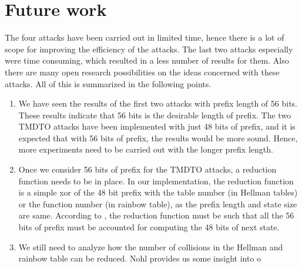 



\section{Future work}

The four attacks have been carried out in limited time, hence there is a lot of scope for improving the efficiency of the attacks. The last two attacks especially were time consuming, which resulted in a less number of results for them. Also there are many open research possibilities on the ideas concerned with these attacks. All of this is summarized in the following points. 

\begin{enumerate}
\item We have seen the results of the first two attacks with prefix length of 56 bits. These results indicate that 56 bits is the desirable length of prefix. The two TMDTO attacks have been implemented with just 48 bits of prefix, and it is expected that with 56 bits of prefix, the results would be more sound. Hence, more experiments need to be carried out with the longer prefix length.

\item Once we consider 56 bits of prefix for the TMDTO attacks, a reduction function needs to be in place. In our implementation, the reduction function is a simple xor of the 48 bit prefix with the table number (in Hellman tables) or the function number (in rainbow table), as the prefix length and state size are same. According to \cite{email-karsten}, the reduction function must be such that all the 56 bits of prefix must be accounted for computing the 48 bits of next state. 

\item We still need to analyze how the number of collisions in the Hellman and rainbow table can be reduced. Nohl provides us some insight into o
\end{enumerate}